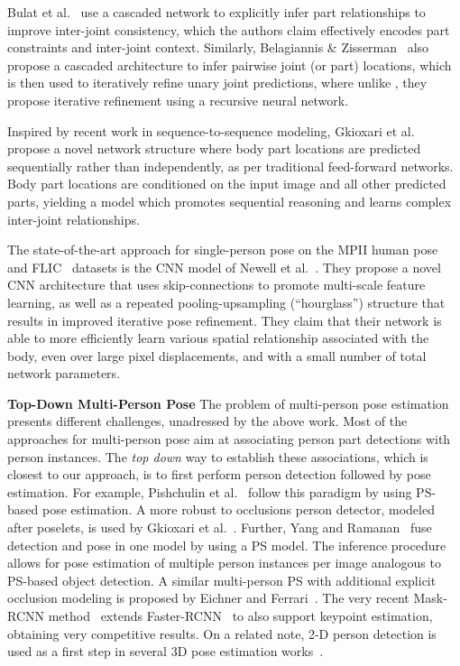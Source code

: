 \documentclass[10pt,twocolumn,letterpaper]{article}
\begin{document}
Bulat et al.~\cite{bulat2016} use a cascaded network to explicitly infer part relationships to improve inter-joint consistency, which the authors claim effectively encodes part constraints and inter-joint context. Similarly, Belagiannis \& Zisserman~\cite{zisserman2016} also propose a cascaded architecture to infer pairwise joint (or part) locations, which is then used to iteratively refine unary joint predictions, where unlike \cite{bulat2016}, they propose iterative refinement using a recursive neural network.

Inspired by recent work in sequence-to-sequence modeling, Gkioxari et al.~\cite{chain16} propose a novel network structure where body part locations are predicted sequentially rather than independently, as per traditional feed-forward networks. Body part locations are conditioned on the input image and all other predicted parts, yielding a model which promotes sequential reasoning and learns complex inter-joint relationships.

The state-of-the-art approach for single-person pose on the MPII human pose~\cite{andriluka14cvpr} and FLIC~\cite{modec2013} datasets is the CNN model of Newell et al.~\cite{stackedhourglass}. They propose a novel CNN architecture that uses skip-connections to promote multi-scale feature learning, as well as a repeated pooling-upsampling (``hourglass'') structure that results in improved iterative pose refinement. They claim that their network is able to more efficiently learn various spatial relationship associated with the body, even over large pixel displacements, and with a small number of total network parameters.

\textbf{Top-Down Multi-Person Pose}
The problem of multi-person pose estimation presents different challenges, unadressed by the above work. Most of the approaches for multi-person pose aim at associating person part detections with person instances. The \textit{top down} way to establish these associations, which is closest to our approach, is to first perform person detection followed by pose estimation. For example, Pishchulin et al.~\cite{pishchulin2012articulated} follow this paradigm by using PS-based pose estimation. A more robust to occlusions person detector, modeled after poselets, is used by Gkioxari et al.~\cite{gkioxari2014using}. Further, Yang and Ramanan~\cite{yang11cvpr} fuse detection and pose in one model by using a PS model. The inference procedure allows for pose estimation of multiple person instances per image analogous to PS-based object detection. A similar multi-person PS with additional explicit occlusion modeling is proposed by Eichner and Ferrari~\cite{eichner2010we}. The very recent Mask-RCNN method~\cite{he2017mask} extends Faster-RCNN~\cite{Ren2015} to also support keypoint estimation, obtaining very competitive results. On a related note, 2-D person detection is used as a first step in several 3D pose estimation works~\cite{sun2011articulated,belagiannis20143d,belagiannis20153d}. 
\end{document}

